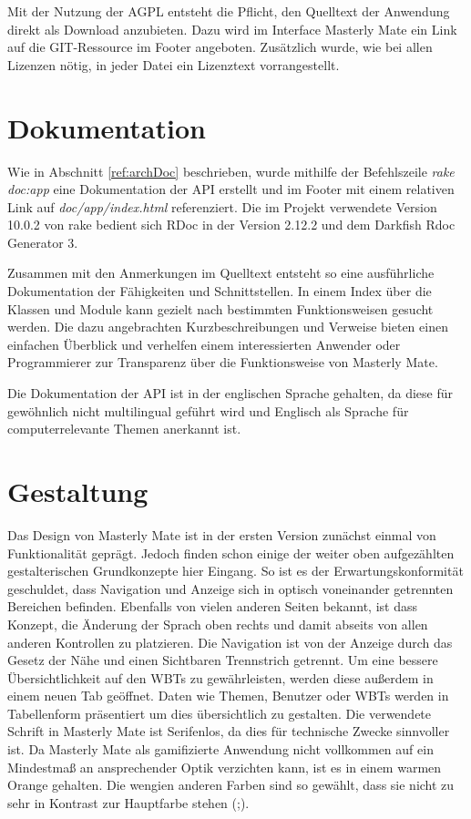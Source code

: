 Mit der Nutzung der AGPL entsteht die Pflicht, den Quelltext der Anwendung
direkt als Download anzubieten. Dazu wird im Interface Masterly Mate
ein Link auf die GIT-Ressource im Footer angeboten. Zusätzlich wurde, wie bei
allen Lizenzen nötig, in jeder Datei ein Lizenztext vorrangestellt.

\section{Dokumentation}
Wie in Abschnitt \ref{ref:archDoc} beschrieben, wurde mithilfe der Befehlszeile
\textit{rake doc:app} eine Dokumentation der API erstellt und im Footer
mit einem relativen Link auf \textit{doc/app/index.html} referenziert. Die im
Projekt verwendete Version 10.0.2 von rake bedient sich RDoc in der Version
2.12.2 und dem Darkfish Rdoc Generator 3.

Zusammen mit den Anmerkungen im Quelltext entsteht so eine ausführliche
Dokumentation der Fähigkeiten und Schnittstellen. In einem Index über die
Klassen und Module kann gezielt nach bestimmten Funktionsweisen gesucht werden.
Die dazu angebrachten Kurzbeschreibungen und Verweise bieten einen einfachen
Überblick und verhelfen einem interessierten Anwender oder Programmierer zur
Transparenz über die Funktionsweise von Masterly Mate.

Die Dokumentation der API ist in der englischen Sprache gehalten, da diese für
gewöhnlich nicht multilingual geführt wird und Englisch als Sprache für
computerrelevante Themen anerkannt ist.

\section{Gestaltung}
Das Design von Masterly Mate ist in der ersten Version zunächst einmal von
Funktionalität geprägt. Jedoch finden schon einige der weiter oben aufgezählten
gestalterischen Grundkonzepte hier Eingang. So ist es der Erwartungskonformität
geschuldet, dass Navigation und Anzeige sich in optisch voneinander getrennten
Bereichen befinden. Ebenfalls von vielen anderen Seiten bekannt, ist dass
Konzept, die Änderung der Sprach oben rechts und damit abseits von allen anderen
Kontrollen zu platzieren. Die Navigation ist von der Anzeige durch das Gesetz
der Nähe und einen Sichtbaren Trennstrich getrennt. Um eine bessere
Übersichtlichkeit auf den WBTs zu gewährleisten, werden diese außerdem in einem
neuen Tab geöffnet. Daten wie Themen, Benutzer oder WBTs werden in Tabellenform
präsentiert um dies übersichtlich zu gestalten. Die verwendete Schrift in
Masterly Mate ist Serifenlos, da dies für technische Zwecke sinnvoller ist. Da
Masterly Mate als gamifizierte Anwendung nicht vollkommen auf ein Mindestmaß an
ansprechender Optik verzichten kann, ist es in einem warmen Orange gehalten.
Die wengien anderen Farben sind so gewählt, dass sie nicht zu sehr in Kontrast
zur Hauptfarbe stehen (\cite{johnson:2000};\cite{nielsen:1995}).

